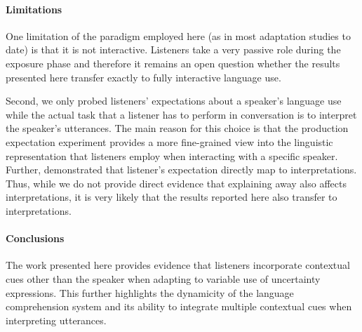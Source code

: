 \documentclass[man,floatsintext]{apa6}
\begin{document}
\paragraph{Limitations} One limitation of the paradigm employed here (as in most adaptation studies to date) is that it is not interactive. Listeners take a very passive role during the exposure phase and therefore it remains an open question whether the results presented here transfer exactly to fully interactive language use.

Second, we only probed listeners' expectations about a speaker's language use while the actual task that a listener has to perform in conversation is to interpret the speaker's utterances. The main reason for this choice is that the production expectation experiment provides a more fine-grained view into the linguistic representation that listeners employ when interacting with a specific speaker. Further,  demonstrated that listener's expectation directly map to interpretations. Thus, while we do not provide direct evidence that explaining away also affects interpretations, it is very likely that the results reported here also transfer to interpretations.


\paragraph{Conclusions}

The work presented here provides evidence that listeners incorporate contextual cues other than the speaker when adapting to variable use of uncertainty expressions. This further highlights the dynamicity of the language comprehension system and its ability to integrate multiple contextual cues when interpreting utterances.



\setlength{\bibleftmargin}{.125in}
\setlength{\bibindent}{-\bibleftmargin}


\end{document}
